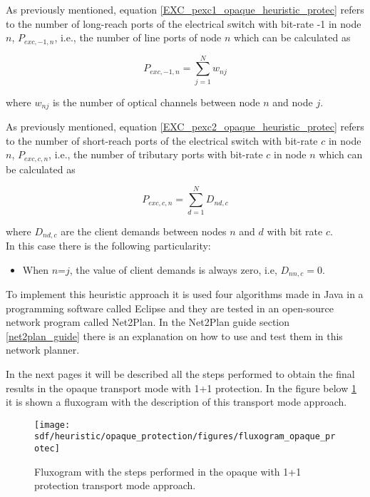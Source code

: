 As previously mentioned, equation \ref{EXC_pexc1_opaque_heuristic_protec} refers to the number of long-reach ports of the electrical switch with bit-rate -1 in node $n$, $P_{exc,-1,n}$, i.e., the number of line ports of node $n$ which can be calculated as

\begin{equation}
P_{exc,-1,n} = \sum_{j=1}^{N} w_{nj}
\label{EXC_pexc1_opaque_heuristic_protec}
\end{equation}

\noindent
where $w_{nj}$ is the number of optical channels between node $n$ and node $j$.

\newpage
\vspace{11pt}
As previously mentioned, equation \ref{EXC_pexc2_opaque_heuristic_protec} refers to the number of short-reach ports of the electrical switch with bit-rate $c$ in node $n$, $P_{exc,c,n}$, i.e., the number of tributary ports with bit-rate $c$ in node $n$ which can be calculated as

\begin{equation}
P_{exc,c,n} = \sum_{d=1}^{N} D_{nd,c}
\label{EXC_pexc2_opaque_heuristic_protec}
\end{equation}

\noindent
where $D_{nd,c}$ are the client demands between nodes $n$ and $d$ with bit rate $c$.\\

\noindent
In this case there is the following particularity:

\begin{itemize}
  \item When $n$=$j$, the value of client demands is always zero, i.e, $D_{nn,c}=0$.
\end{itemize}

\vspace{11pt}
To implement this heuristic approach it is used four algorithms made in Java in a programming software called Eclipse and they are tested in an open-source network program called Net2Plan. In the Net2Plan guide section \ref{net2plan_guide} there is an explanation on how to use and test them in this network planner.

In the next pages it will be described all the steps performed to obtain the final results in the opaque transport mode with 1+1 protection. In the figure below \ref{fluxogram_opaque_protec} it is shown a fluxogram with the description of this transport mode approach.

\begin{figure}[H]
\centering
\texttt{[image: sdf/heuristic/opaque\_protection/figures/fluxogram\_opaque\_protec]}
\caption{Fluxogram with the steps performed in the opaque with 1+1 protection transport mode approach.}
\label{fluxogram_opaque_protec}
\end{figure}

